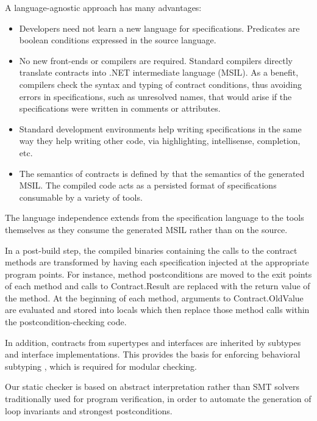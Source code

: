 \documentclass[10pt,twocolumn]{article}
\begin{document}
A language-agnostic approach has many advantages: 
\begin{itemize}
\item Developers need not learn a new language for
specifications. Predicates are boolean conditions expressed in the
source language.
\item No new front-ends or compilers are required. Standard compilers directly translate contracts into
  .NET intermediate language (MSIL). As a benefit, compilers
  check the syntax and typing of contract conditions, thus avoiding errors in specifications,
  such as unresolved names, that would arise if the specifications
  were written in comments or attributes.
\item Standard development environments help writing
  specifications in the same way they help writing other code, via highlighting, intellisense,
  completion, etc.
\item The semantics of contracts is defined by that the semantics of the generated MSIL. 
  The compiled code acts as a persisted format of specifications consumable by a variety of tools.
\end{itemize}
The language independence extends from the specification language to
the tools themselves as they consume the
generated MSIL rather than on the source.

In a post-build step, the compiled binaries containing the calls to the contract
methods are transformed by having each specification injected at the 
appropriate program points.
For instance, method postconditions are moved to the exit points of each method
and calls to Contract.Result are replaced with the return value of the method.
At the beginning of each method, arguments to Contract.OldValue are evaluated and
stored into locals which then replace those method calls within the postcondition-checking
code.

In addition, contracts from supertypes and interfaces are inherited by subtypes
and interface implementations. This provides the basis for enforcing behavioral
subtyping \cite{Liskov-Wing94}, which is required for modular checking.

Our static checker is based on abstract interpretation rather than
SMT solvers traditionally used for program verification, in order to
automate the generation of loop
invariants and strongest postconditions.
\end{document}

